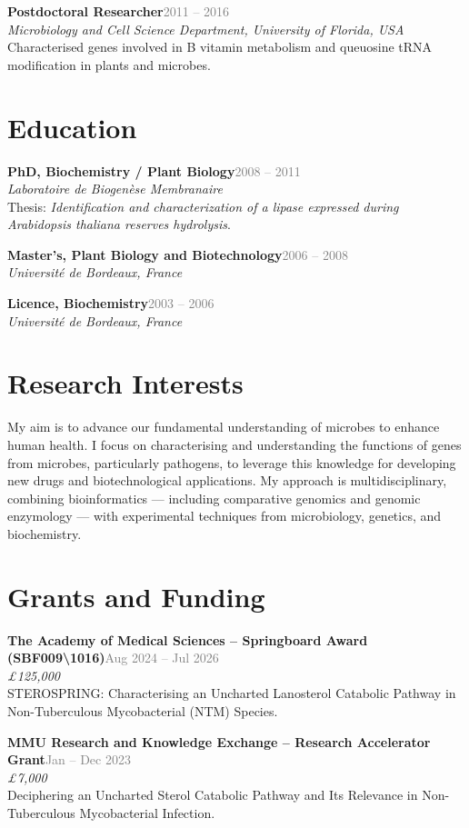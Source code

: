 \documentclass[10pt,a4paper]{article}
\newcommand{\cvdate}[1]{\textcolor{graytext}{\small #1}}
\newcommand{\cventry}[4]{%
  \noindent\textbf{#1}\hfill\cvdate{#2}\\
  \textit{#3}\\
  #4\par\vspace{0.4em}
}
\begin{document}
\cventry{Postdoctoral Researcher}{2011 -- 2016}
  {Microbiology and Cell Science Department, University of Florida, USA}
  {Characterised genes involved in B vitamin metabolism and queuosine tRNA modification in plants and microbes.}

\section*{Education}

\cventry{PhD, Biochemistry / Plant Biology}{2008 -- 2011}
  {Laboratoire de Biogenèse Membranaire}
  {Thesis: \textit{Identification and characterization of a lipase expressed during Arabidopsis thaliana reserves hydrolysis}.}

\cventry{Master's, Plant Biology and Biotechnology}{2006 -- 2008}
  {Université de Bordeaux, France}{}

\cventry{Licence, Biochemistry}{2003 -- 2006}
  {Université de Bordeaux, France}{}

\section*{Research Interests}

My aim is to advance our fundamental understanding of microbes to enhance human health. I focus on characterising and understanding the functions of genes from microbes, particularly pathogens, to leverage this knowledge for developing new drugs and biotechnological applications. My approach is multidisciplinary, combining bioinformatics --- including comparative genomics and genomic enzymology --- with experimental techniques from microbiology, genetics, and biochemistry.

\section*{Grants and Funding}

\cventry{The Academy of Medical Sciences -- Springboard Award (SBF009\textbackslash1016)}{Aug 2024 -- Jul 2026}
  {£125,000}
  {STEROSPRING: Characterising an Uncharted Lanosterol Catabolic Pathway in Non-Tuberculous Mycobacterial (NTM) Species.}

\cventry{MMU Research and Knowledge Exchange -- Research Accelerator Grant}{Jan -- Dec 2023}
  {£7,000}
  {Deciphering an Uncharted Sterol Catabolic Pathway and Its Relevance in Non-Tuberculous Mycobacterial Infection.}
\end{document}
